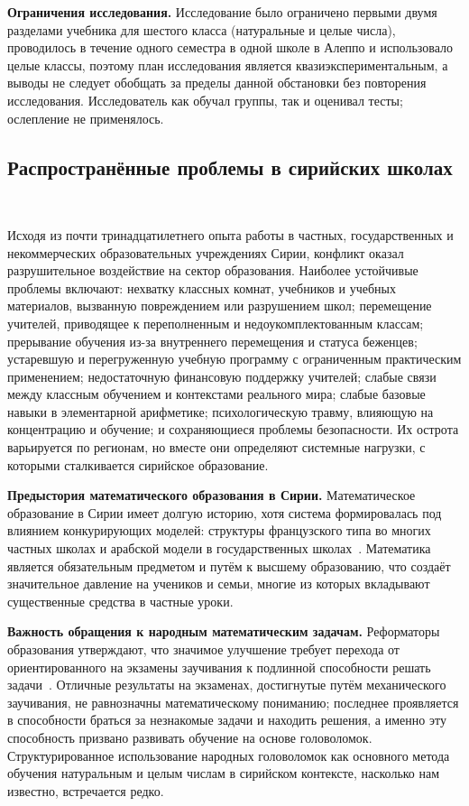 \documentclass[a4paper,14pt]{extreport}
\theoremstyle{plain}
\theoremstyle{definition}
\theoremstyle{remark}
\begin{document}
\textbf{Ограничения исследования.} Исследование было ограничено первыми двумя разделами учебника для шестого класса (натуральные и целые числа), проводилось в течение одного семестра в одной школе в Алеппо и использовало целые классы, поэтому план исследования является квазиэкспериментальным, а выводы не следует обобщать за пределы данной обстановки без повторения исследования.
Исследователь как обучал группы, так и оценивал тесты; ослепление не применялось.

\subsection{Распространённые проблемы в сирийских школах}~\label{sec4.3.4}

Исходя из почти тринадцатилетнего опыта работы в частных, государственных и некоммерческих образовательных учреждениях Сирии, конфликт оказал разрушительное воздействие на сектор образования. Наиболее устойчивые проблемы включают: нехватку классных комнат, учебников и учебных материалов, вызванную повреждением или разрушением школ; перемещение учителей, приводящее к переполненным и недоукомплектованным классам; прерывание обучения из-за внутреннего перемещения и статуса беженцев; устаревшую и перегруженную учебную программу с ограниченным практическим применением; недостаточную финансовую поддержку учителей; слабые связи между классным обучением и контекстами реального мира; слабые базовые навыки в элементарной арифметике; психологическую травму, влияющую на концентрацию и обучение; и сохраняющиеся проблемы безопасности. Их острота варьируется по регионам, но вместе они определяют системные нагрузки, с которыми сталкивается сирийское образование. 

\textbf{Предыстория математического образования в Сирии.}
Математическое образование в Сирии имеет долгую историю, хотя система формировалась под влиянием конкурирующих моделей: структуры французского типа во многих частных школах и арабской модели в государственных школах~\cite{Almustafa}. Математика является обязательным предметом и путём к высшему образованию, что создаёт значительное давление на учеников и семьи, многие из которых вкладывают существенные средства в частные уроки. 

\textbf{Важность обращения к народным математическим задачам.}
Реформаторы образования утверждают, что значимое улучшение требует перехода от ориентированного на экзамены заучивания к подлинной способности решать задачи~\cite{Grcar}.
Отличные результаты на экзаменах, достигнутые путём механического заучивания, не равнозначны математическому пониманию; последнее проявляется в способности браться за незнакомые задачи и находить решения, а именно эту способность призвано развивать обучение на основе головоломок. Структурированное использование народных головоломок как основного метода обучения натуральным и целым числам в сирийском контексте, насколько нам известно, встречается редко.
\end{document}
